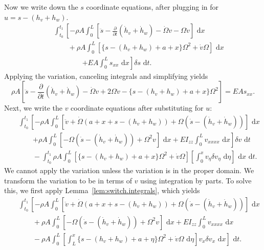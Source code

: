 Now we write down the $s$ coordinate equations, after plugging in for $u = s-(h_v+h_w)$.
\begin{eqnarray}
& & \int_{t_0}^{t_1}\left[-\rho A\int_0^L  \left[\ddot s-\frac{\partial}{\partial t}(\dot h_v+\dot h_w)-\dot \Omega v-\Omega \dot v\right]\text{ d}x\right. \nonumber \\
& & \qquad +\rho A\int_0^L  [\lbrace s-(h_v+h_w)+a+x\rbrace\Omega^2+\dot v\Omega]\text{ d}x \\
& & \qquad \qquad \left.+EA\int_0^L s_{xx}\text{ d}x \right]\delta s\text{ d}t.\nonumber
\end{eqnarray}
Applying the variation, canceling integrals and simplifying yields
\begin{equation}
\label{eq:s.full.nonlinear}
\rho A \left[\ddot s-\frac{\partial}{\partial t}(\dot h_v+\dot h_w)-\dot \Omega v+2\Omega\dot v-\lbrace s-(h_v+h_w)+a+x\rbrace\Omega^2\right] = EAs_{xx}.
\end{equation}
Next, we write the $v$ coordinate equations after substituting for $u$:
\begin{eqnarray}
& & \int_{t_0}^{t_1}\left[-\rho A \int_0^L [\ddot v + \dot \Omega (a+x+s-(h_v+h_w))+\Omega(\dot s - (\dot h_v+\dot h_w))]\text{ d}x\right.\nonumber \\ 
& & \qquad\left. +\rho A\int_0^L  [-\Omega(\dot s-(\dot h_v+\dot h_w))+\Omega^2v] \text{ d}x + EI_{zz}\int_0^L v_{xxxx}\text{ d}x\right]\delta v\text{ d}t\\
& & \qquad -\int_{t_0}^{t_1}\rho A\int_0^L [\lbrace s-(h_v+h_w)+a+x\rbrace\Omega^2+\dot v\Omega]\left[\int_0^xv_{\eta}\delta v_{\eta}\text{ d}\eta\right]\text{ d}x\text{ d}t.\nonumber
\end{eqnarray}
We cannot apply the variation unless the variation is in the proper domain. We transform the variation to be in terms of $v$ using integration by parts. To solve this, we first apply Lemma~\ref{lem:switch.integrals}, which yields
\begin{eqnarray}
& & \int_{t_0}^{t_1}\left[-\rho A \int_0^L [\ddot v + \dot \Omega (a+x+s-(h_v+h_w))+\Omega(\dot s - (\dot h_v+\dot h_w))]\text{ d}x\right.\nonumber \\ 
& & \qquad +\rho A\int_0^L  [-\Omega(\dot s-(\dot h_v+\dot h_w))+\Omega^2v] \text{ d}x + EI_{zz}\int_0^L v_{xxxx}\text{ d}x\\
& & \qquad -\left.\rho A\int_0^L \left[\int_L^x\lbrace s-(h_v+h_w)+a+\eta\rbrace\Omega^2+\dot v\Omega\text{ d}\eta\right] v_{x}\delta v_x\text{ d}x\right]\text{ d}t.\nonumber
\end{eqnarray}
